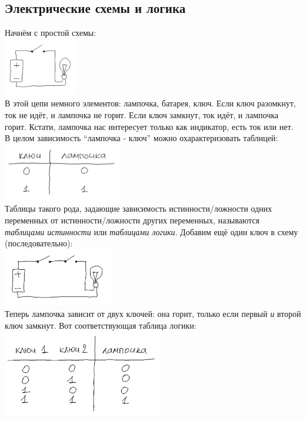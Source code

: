 \documentclass[11pt]{book}
\begin{document}
\subsection{Электрические схемы и логика}
Начнём с простой схемы:
\\
\includegraphics[height=1in]{pic/2.png}
\\
В этой цепи немного элементов: лампочка, батарея, ключ. Если ключ разомкнут,
ток не идёт, и лампочка не горит. Если ключ замкнут, ток идёт, и лампочка горит.
Кстати, лампочка нас интересует только как индикатор, есть ток или нет.
В целом зависимость ``лампочка - ключ'' можно охарактеризовать таблицей:
\\
\includegraphics[height=1in]{pic/3.png}
\\
Таблицы такого рода, задающие зависимость истинности/ложности одних переменных
от истинности/ложности других переменных, называются \emph{таблицами истинности} или \emph{таблицами логики}.
Добавим ещё один ключ в схему (последовательно):
\\
\includegraphics[height=1in]{pic/4.png}
\\
Теперь лампочка зависит от двух ключей: она горит, только если первый
\emph{и} второй ключ замкнут. Вот соответствующая таблица логики:
\\
\includegraphics[height=1.5in]{pic/5.png}
\end{document}
